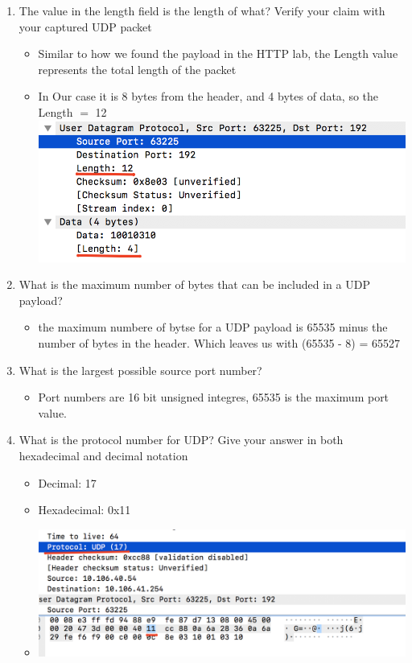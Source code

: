 \documentclass{article}
\begin{document}
\begin{enumerate}
    \item The value in the length field is the length of what?  Verify your claim with your captured UDP packet
        \begin{itemize}
          \item Similar to how we found the payload in the HTTP lab, the Length value represents the total length of the packet
          \item In Our case it is 8 bytes from the header, and 4 bytes of data, so the Length $=$ 12
          \includegraphics[scale=0.5]{images/UDP3.png}
        \end{itemize}

    \item What is the maximum number of bytes that can be included in a UDP payload?
        \begin{itemize}
          \item the maximum numbere of bytse for a UDP payload is 65535 minus the number of bytes in the header. Which leaves us with (65535 - 8) = 65527 
        \end{itemize}

    \item What is the largest possible source port number?
        \begin{itemize}
          \item Port numbers are 16 bit unsigned integres, 65535 is the maximum port value.
        \end{itemize}

    \item What is the protocol number for UDP?  Give your answer in both hexadecimal and decimal notation
        \begin{itemize}
          \item Decimal: 17
          \item Hexadecimal: 0x11
          \item \includegraphics[scale=0.5]{images/UDP7.png}
        \end{itemize}


\end{enumerate}
\end{document}
